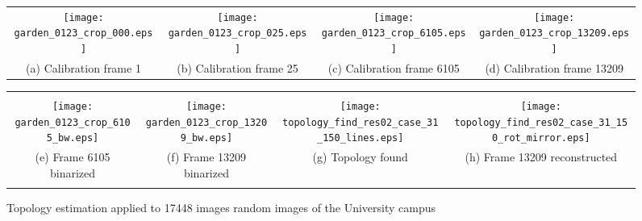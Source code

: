 \begin{figure}
\centering
%
\begin{tabular}{cccc}
\texttt{[image: garden\_0123\_crop\_000.eps]} & 
\texttt{[image: garden\_0123\_crop\_025.eps]} & 
\texttt{[image: garden\_0123\_crop\_6105.eps]} & 
\texttt{[image: garden\_0123\_crop\_13209.eps]} \\
\parbox{2cm}{\centering \small (a) Calibration frame 1} &
\parbox{2cm}{\centering \small (b) Calibration frame 25} &
\parbox{2cm}{\centering \small (c) Calibration frame 6105} &
\parbox{2cm}{\centering \small (d) Calibration frame 13209} \\
\end{tabular}
%
\begin{tabular}{cccc}
\vspace{3mm} \\
\texttt{[image: garden\_0123\_crop\_6105\_bw.eps]} &
\texttt{[image: garden\_0123\_crop\_13209\_bw.eps]} & \texttt{[image: topology\_find\_res02\_case\_31\_150\_lines.eps]} & \texttt{[image: topology\_find\_res02\_case\_31\_150\_rot\_mirror.eps]} \\
%
\parbox{2cm}{\centering \small (e) Frame 6105 binarized} &
\parbox{2cm}{\centering \small (f) Frame 13209 binarized} &
\parbox{2cm}{\centering \small (g) Topology found} &
\parbox{2cm}{\centering \small (h) Frame 13209 reconstructed} \\
%
\vspace{3mm} \\
\end{tabular}
%
\caption{
Topology estimation applied to 17448 images random images of the University campus
}
\label{fig:results3}
\end{figure}
